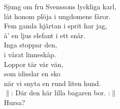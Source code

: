 \documentclass[a6paper,10pt]{article}
\begin{document}
\begin{center}
\end{center}
\begin{lyrics}
\small Sjung om fru Svenssons lyckliga karl,\\
låt honom plöja i ungdomens fåror.\\
Fem gamla hjärtan i sprit har jag,\\
å' en ljus elefant i ett snår.\\
Inga stoppar den,\\
i vårat linneskåp.\\
Loppor tär vår vän, \\
som idisslar en sko \\
när vi snyta en rund liten hund.\\
$\|$: Där den här lilla bagaren bor. :$\|$\\
Hursa?
\end{lyrics}
\end{document}
